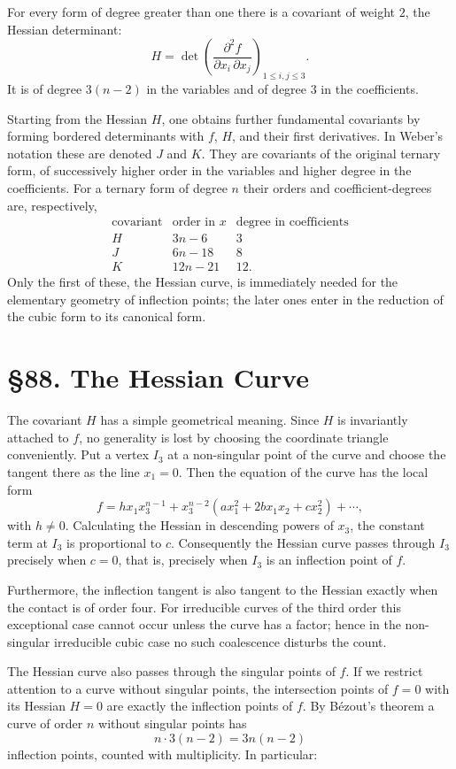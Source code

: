 \documentclass[12pt,a4paper]{article}
\newcommand{\webersection}[2]{\section*{\S #1. #2}\addcontentsline{toc}{section}{\S #1. #2}}
\begin{document}
For every form of degree greater than one there is a covariant of weight \(2\), the Hessian determinant:
\[
H=\det\left(\frac{\partial^2 f}{\partial x_i\,\partial x_j}\right)_{1\le i,j\le 3}.
\]
It is of degree \(3(n-2)\) in the variables and of degree \(3\) in the coefficients.

Starting from the Hessian \(H\), one obtains further fundamental covariants by forming bordered determinants with \(f\), \(H\), and their first derivatives.  In Weber's notation these are denoted \(J\) and \(K\).  They are covariants of the original ternary form, of successively higher order in the variables and higher degree in the coefficients.  For a ternary form of degree \(n\) their orders and coefficient-degrees are, respectively,
\[
\begin{array}{c|c|c}
\text{covariant} & \text{order in }x & \text{degree in coefficients}\\
\hline
H & 3n-6 & 3\\
J & 6n-18 & 8\\
K & 12n-21 & 12.
\end{array}
\]
Only the first of these, the Hessian curve, is immediately needed for the elementary geometry of inflection points; the later ones enter in the reduction of the cubic form to its canonical form.

\webersection{88}{The Hessian Curve}

The covariant \(H\) has a simple geometrical meaning.  Since \(H\) is invariantly attached to \(f\), no generality is lost by choosing the coordinate triangle conveniently.  Put a vertex \(I_3\) at a non-singular point of the curve and choose the tangent there as the line \(x_1=0\).  Then the equation of the curve has the local form
\[
f=hx_1x_3^{n-1}
+x_3^{n-2}(ax_1^2+2bx_1x_2+cx_2^2)
+\cdots ,
\]
with \(h\ne0\).  Calculating the Hessian in descending powers of \(x_3\), the constant term at \(I_3\) is proportional to \(c\).  Consequently the Hessian curve passes through \(I_3\) precisely when \(c=0\), that is, precisely when \(I_3\) is an inflection point of \(f\).

Furthermore, the inflection tangent is also tangent to the Hessian exactly when the contact is of order four.  For irreducible curves of the third order this exceptional case cannot occur unless the curve has a factor; hence in the non-singular irreducible cubic case no such coalescence disturbs the count.

The Hessian curve also passes through the singular points of \(f\).  If we restrict attention to a curve without singular points, the intersection points of \(f=0\) with its Hessian \(H=0\) are exactly the inflection points of \(f\).  By Bézout's theorem a curve of order \(n\) without singular points has
\[
n\cdot 3(n-2)=3n(n-2)
\]
inflection points, counted with multiplicity.  In particular:
\end{document}
